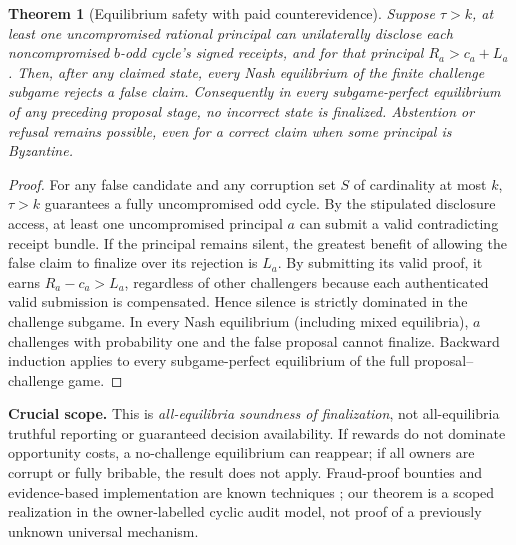 \documentclass[10pt,a4paper]{article}
\newtheorem{theorem}{Theorem}
\begin{document}
\begin{theorem}[Equilibrium safety with paid counterevidence]\label{thm:eq}
Suppose $\tau>k$, at least one uncompromised rational principal can unilaterally disclose each noncompromised $b$-odd cycle's signed receipts, and for that principal $R_a>c_a+L_a$. Then, after any claimed state, \emph{every Nash equilibrium of the finite challenge subgame} rejects a false claim. Consequently in \emph{every subgame-perfect equilibrium} of any preceding proposal stage, no incorrect state is finalized. Abstention or refusal remains possible, even for a correct claim when some principal is Byzantine.
\end{theorem}
\begin{proof}
For any false candidate and any corruption set $S$ of cardinality at most $k$, $\tau>k$ guarantees a fully uncompromised odd cycle. By the stipulated disclosure access, at least one uncompromised principal $a$ can submit a valid contradicting receipt bundle. If the principal remains silent, the greatest benefit of allowing the false claim to finalize over its rejection is $L_a$. By submitting its valid proof, it earns $R_a-c_a>L_a$, regardless of other challengers because each authenticated valid submission is compensated. Hence silence is strictly dominated in the challenge subgame. In every Nash equilibrium (including mixed equilibria), $a$ challenges with probability one and the false proposal cannot finalize. Backward induction applies to every subgame-perfect equilibrium of the full proposal--challenge game.\end{proof}

\textbf{Crucial scope.} This is \emph{all-equilibria soundness of finalization}, not all-equilibria truthful reporting or guaranteed decision availability. If rewards do not dominate opportunity costs, a no-challenge equilibrium can reappear; if all owners are corrupt or fully bribable, the result does not apply. Fraud-proof bounties and evidence-based implementation are known techniques \cite{banerjee2024,incentive2026}; our theorem is a scoped realization in the owner-labelled cyclic audit model, not proof of a previously unknown universal mechanism.
\end{document}
